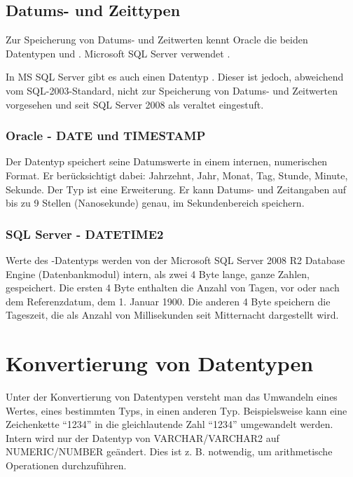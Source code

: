         \subsection{Datums- und Zeittypen}
          Zur Speicherung von Datums- und Zeitwerten kennt Oracle die beiden Datentypen  und . Microsoft SQL Server verwendet .
          \begin{merke}
            In MS SQL Server gibt es auch einen Datentyp . Dieser ist jedoch, abweichend vom SQL-2003-Standard, nicht zur Speicherung von Datums- und Zeitwerten vorgesehen und seit SQL Server 2008 als veraltet eingestuft.
          \end{merke}
          \subsubsection{Oracle - DATE und TIMESTAMP}
            Der Datentyp  speichert seine Datumswerte in einem internen, numerischen Format. Er ber\"ucksichtigt dabei: Jahrzehnt, Jahr, Monat, Tag, Stunde, Minute, Sekunde. Der Typ  ist eine Erweiterung. Er kann Datums- und Zeitangaben auf bis zu 9 Stellen (Nanosekunde) genau, im Sekundenbereich speichern.
          \subsubsection{SQL Server - DATETIME2}
            Werte des -Datentyps werden von der Microsoft SQL Server 2008 R2 Database Engine (Datenbankmodul) intern, als zwei 4 Byte lange, ganze Zahlen, gespeichert. Die ersten 4 Byte enthalten die Anzahl von Tagen, vor oder nach dem Referenzdatum, dem 1. Januar 1900. Die anderen 4 Byte speichern die Tageszeit, die als Anzahl von Millisekunden seit Mitternacht dargestellt wird.
    \section{Konvertierung von Datentypen}
      Unter der Konvertierung von Datentypen versteht man das Umwandeln eines Wertes, eines bestimmten Typs, in einen anderen Typ. Beispielsweise kann eine Zeichenkette \enquote{1234} in die gleichlautende Zahl \enquote{1234} umgewandelt werden. Intern wird nur der Datentyp von VARCHAR/VARCHAR2 auf NUMERIC/NUMBER ge\"andert. Dies ist z. B. notwendig, um arithmetische Operationen durchzuf\"uhren.
